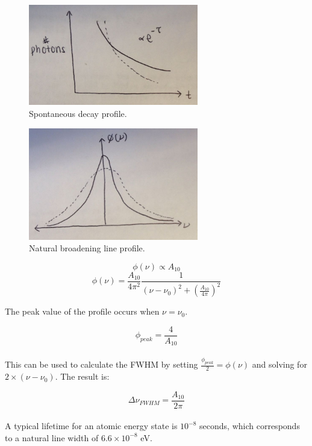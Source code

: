 \documentclass{article}
\begin{document}
\begin{figure}[ht]
    \centering
    \includegraphics[width=0.66\textwidth]{decay.jpg}
    \caption{Spontaneous decay profile.}
    \label{fig:decay}
\end{figure}

\begin{figure}[ht]
    \centering
    \includegraphics[width=0.66\textwidth]{natural.jpg}
    \caption{Natural broadening line profile.}
    \label{fig:natural}
\end{figure}


$$\phi(\nu) \propto A_{10}$$
$$\phi(\nu) = {\frac{A_{10}}{4\pi^{2}}}{\frac{1}{(\nu-\nu_{0})^{2}+({\frac{A_{10}}{4\pi}})^{2}}}$$

The peak value of the profile occurs when $\nu =\nu_{0}$.

$$\phi_{peak} = {\frac{4}{A_{10}}}$$ \\

This can be used to calculate the FWHM by setting ${\frac{\phi_{peak}}{2}} = \phi(\nu)$ and solving for $2\times (\nu-\nu_{0})$. The result is:

$$\Delta\nu_{FWHM} = {\frac{A_{10}}{2\pi}}$$\\

A typical lifetime for an atomic energy state is $10^{-8}$ seconds, which corresponds to a natural line width of $6.6 \times 10^{-8}$ eV.\\
\end{document}
